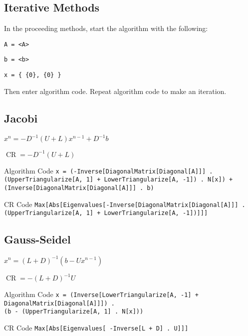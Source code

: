 \documentclass[11pt,letterpaper]{article}
\newenvironment{tight_item}
{\begin{itemize}
\setlength{\parskip}{0pt}
\setlength{\parsep}{0pt}
\setlength{\itemsep}{0pt}
\setlength{\parsep}{0pt}
\setlength{\topsep}{0pt}
\setlength{\partopsep}{0pt}
\setlength{\leftmargin}{0em}
\setlength{\labelwidth}{0em}
\setlength{\labelsep}{1em} }
{\end{itemize}}
\newenvironment{tight_enum}
{\begin{enumerate}
\setlength{\parskip}{0pt}
\setlength{\parsep}{0pt}
\setlength{\itemsep}{0pt}
\setlength{\parsep}{0pt}
\setlength{\topsep}{0pt}
\setlength{\partopsep}{0pt}
\setlength{\leftmargin}{0em}
\setlength{\labelwidth}{0em}
\setlength{\labelsep}{1em} }
{\end{enumerate}}
\newenvironment{tight_desc}
{\begin{description}
\setlength{\parskip}{0pt}
\setlength{\parsep}{0pt}
\setlength{\itemsep}{0pt}
\setlength{\parsep}{0pt}
\setlength{\topsep}{0pt}
\setlength{\partopsep}{0pt}
\setlength{\leftmargin}{0em}
\setlength{\labelwidth}{0em}
\setlength{\labelsep}{1em} }
{\end{description}}
\begin{document}
\footnotesize{

\begin{multicols*}{2}

\section{Iterative Methods}
In the proceeding methods, start the algorithm with the following:
\begin{tight_enum}
\item \texttt{A = <A>}
\item \texttt{b = <b>}
\item \texttt{x = \{ \{0\}, \{0\} \} }
\end{tight_enum}
Then enter algorithm code. Repeat algorithm code to make an iteration.

\subsection{Jacobi}
\begin{tight_item}
\item $x^{n} = -D^{-1}(U + L)x^{n-1}+ D^{-1}b$
\item $\operatorname{CR} = -D^{-1}(U+L)$
\end{tight_item}
\begin{tight_desc}
\item[Algorithm Code] \texttt{x = (-Inverse[DiagonalMatrix[Diagonal[A]]] .\\(UpperTriangularize[A, 1] + LowerTriangularize[A, -1]) . N[x]) +\\(Inverse[DiagonalMatrix[Diagonal[A]]] . b)}
\item[CR Code] \texttt{Max[Abs[Eigenvalues[-Inverse[DiagonalMatrix[Diagonal[A]]] .\\(UpperTriangularize[A, 1] + LowerTriangularize[A, -1])]]]}
\end{tight_desc}

\subsection{Gauss-Seidel}
\begin{tight_item}
\item $x^{n} = (L+D)^{-1}(b-Ux^{n-1})$
\item $\operatorname{CR} = -(L+D)^{-1}U$
\end{tight_item}
\begin{tight_desc}
\item[Algorithm Code] \texttt{x = (Inverse[LowerTriangularize[A, -1] +\\DiagonalMatrix[Diagonal[A]]]) .\\(b - (UpperTriangularize[A, 1] . N[x]))}
\item[CR Code] \texttt{Max[Abs[Eigenvalues[ -Inverse[L + D] . U]]]}
\end{tight_desc}


\end{multicols*}}
\end{document}
